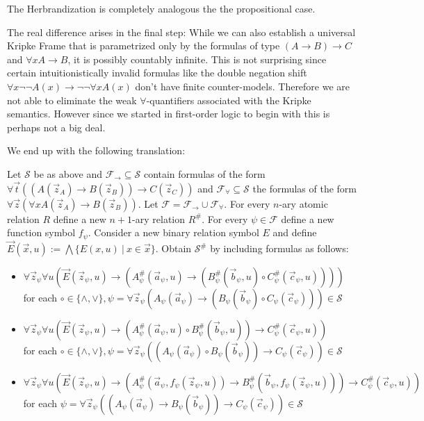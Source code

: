 \documentclass[a4paper,UKenglish,cleveref, autoref, thm-restate]{lipics-v2021}
\begin{document}
The Herbrandization is completely analogous the the propositional case.

The real difference arises in the final step: While we can also establish a universal Kripke Frame that is parametrized only by the formulas of type $(A\to B)\to C$ and $\forall xA\to B$, it is possibly countably infinite. This is not surprising since certain intuitionistically invalid formulas like the double negation shift $\forall x\neg\neg A(x)\to \neg\neg\forall x A(x)$ don't have finite counter-models. Therefore we are not able to eliminate the weak $\forall$-quantifiers associated with the Kripke semantics. However since we started in first-order logic to begin with this is perhaps not a big deal.

We end up with the following translation:

\begin{theorem}
	Let $\mathcal S$ be as above and $\mathcal F_\to\subseteq\mathcal S$ contain formulas of the form $\forall \vec t((A(\vec z_A)\to B(\vec z_B))\to C(\vec z_C))$ and $\mathcal F_\forall\subseteq\mathcal S$ the formulas of the form $\forall \vec z(\forall xA(\vec z_A)\to B(\vec z_B))$. Let $\mathcal F = \mathcal F_\to\cup\mathcal F_\forall$. For every $n$-ary atomic relation $R$ define a new $n+1$-ary relation $R^\#$. For every $\psi\in\mathcal F$ define a new function symbol $f_\psi$. Consider a new binary relation symbol $E$ and define $\vec E(\vec x, u) := \bigwedge\{E(x, u)\:|\:x\in\vec x\}$. Obtain $\mathcal S^\#$ by including formulas as follows:
	\begin{itemize}
		\item $\forall \vec z_\psi\forall u(\vec E(\vec z_\psi, u)\to (A_\psi^\#(\vec a_\psi, u)\to (B_\psi^\#(\vec b_\psi, u)\circ C_\psi^\#(\vec c_\psi, u))))$\\for each $\circ\in\{\wedge, \vee\}, \psi = \forall \vec z_\psi(A_\psi(\vec a_\psi)\to (B_\psi(\vec b_\psi)\circ C_\psi(\vec c_\psi)))\in\mathcal S$
		\item $\forall \vec z_\psi\forall u(\vec E(\vec z_\psi, u)\to (A_\psi^\#(\vec a_\psi, u)\circ B_\psi^\#(\vec b_\psi, u))\to C_\psi^\#(\vec c_\psi, u))$\\for each $\circ\in\{\wedge, \vee\}, \psi = \forall \vec z_\psi((A_\psi(\vec a_\psi)\circ B_\psi(\vec b_\psi))\to C_\psi(\vec c_\psi))\in\mathcal S$
		\item $\forall \vec z_\psi\forall u(\vec E(\vec z_\psi, u)\to(A_\psi^\#(\vec a_\psi, f_\psi(\vec z_\psi, u))\to B_\psi^\#(\vec b_\psi, f_\psi(\vec z_\psi, u)))\to C_\psi^\#(\vec c_\psi, u))$ for each $\psi = \forall \vec z_\psi((A_\psi(\vec a_\psi)\to B_\psi(\vec b_\psi))\to C_\psi(\vec c_\psi))\in\mathcal S$

\end{itemize}
\end{theorem}
\end{document}
